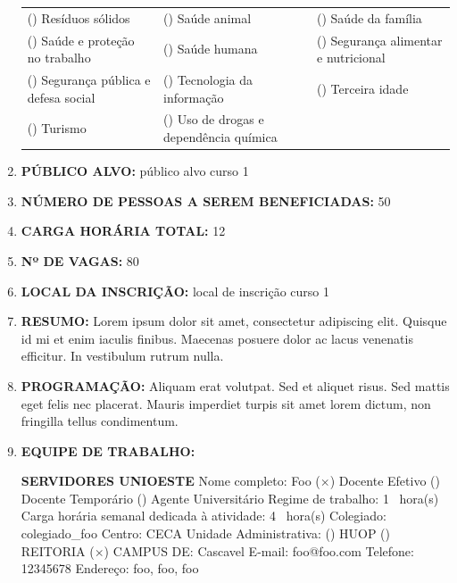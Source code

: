 \documentclass[12pt,a4paper,oneside]{article}%
\begin{document}
\begin{enumerate}
{\begin{tabularx}{\linewidth}{X|X|X}
() Resíduos sólidos&() Saúde animal&() Saúde da família\\%
() Saúde e proteção no trabalho&() Saúde humana&() Segurança alimentar e nutricional\\%
() Segurança pública e defesa social&() Tecnologia da informação&() Terceira idade\\%
() Turismo&() Uso de drogas e dependência química&\\%
\end{tabularx}%
}%
\item%
\textbf{PÚBLICO ALVO: }%
público alvo curso 1%
\item%
\textbf{NÚMERO DE PESSOAS A SEREM BENEFICIADAS: }%
50%
\item%
\textbf{CARGA HORÁRIA TOTAL: }%
12%
\item%
\textbf{Nº DE VAGAS: }%
80%
\item%
\textbf{LOCAL DA INSCRIÇÃO: }%
local de inscrição curso 1%
\item%
\textbf{RESUMO: }%
\newline%
Lorem ipsum dolor sit amet, consectetur adipiscing elit. Quisque id mi et enim iaculis finibus. Maecenas posuere dolor ac lacus venenatis efficitur. In vestibulum rutrum nulla.%
\item%
\textbf{PROGRAMAÇÃO: }%
Aliquam erat volutpat. Sed et aliquet risus. Sed mattis eget felis nec placerat. Mauris imperdiet turpis sit amet lorem dictum, non fringilla tellus condimentum.%
\item%
\textbf{EQUIPE DE TRABALHO: }%
\newline%
\begin{mdframed}[innertopmargin=5pt, innerleftmargin=3pt, innerrightmargin=3pt]%
\textbf{SERVIDORES UNIOESTE }%
\newline%
Nome completo: %
Foo%
\newline%
 ($\times$) Docente Efetivo %
 () Docente Temporário %
 () Agente Universitário %
\newline%
Regime de trabalho: %
1%
\ hora(s) \hfill%
Carga horária semanal dedicada à atividade: %
4%
\ hora(s) \hfill%
\newline%
Colegiado: %
colegiado\_foo%
\hfill%
Centro: %
CECA%
\newline%
Unidade Administrativa: %
() HUOP %
() REITORIA %
($\times$) CAMPUS DE: %
Cascavel%
\newline%
E-mail: %
foo@foo.com%
\newline%
Telefone: %
12345678%
\newline%
Endereço: %
foo, foo, foo%
\newline%

\end{mdframed}
\end{enumerate}
\end{document}
